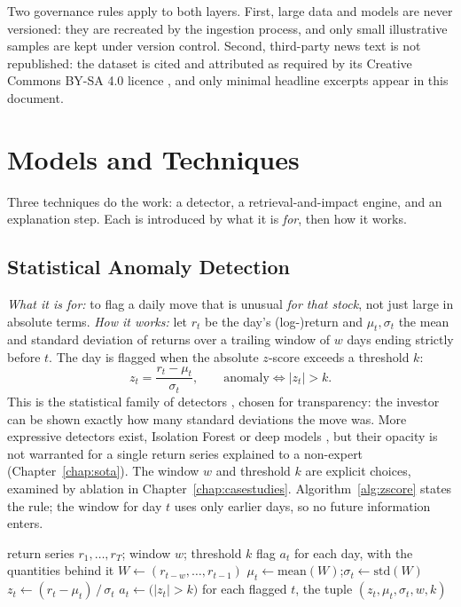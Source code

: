 Two governance rules apply to both layers. First, large data and models are never versioned: they are
recreated by the ingestion process, and only small illustrative samples are kept under version control.
Second, third-party news text is not republished: the dataset is cited and attributed as required by its
Creative Commons BY-SA 4.0 licence \autocite{dong2024fnspid}, and only minimal headline excerpts appear
in this document.

\section{Models and Techniques}
\label{sec:met_techniques}

Three techniques do the work: a detector, a retrieval-and-impact engine, and an explanation step. Each is
introduced by what it is \emph{for}, then how it works.

\subsection{Statistical Anomaly Detection}
\label{sec:met_anomaly}

\emph{What it is for:} to flag a daily move that is unusual \emph{for that stock}, not just large in
absolute terms. \emph{How it works:} let $r_t$ be the day's (log-)return and $\mu_t,\sigma_t$ the mean and
standard deviation of returns over a trailing window of $w$ days ending strictly before $t$. The day is
flagged when the absolute $z$-score exceeds a threshold $k$:
\begin{equation}
z_t = \frac{r_t - \mu_t}{\sigma_t}, \qquad \text{anomaly} \iff |z_t| > k .
\label{eq:zscore}
\end{equation}
This is the statistical family of detectors \autocite{chandola2009anomaly}, chosen for transparency: the
investor can be shown exactly how many standard deviations the move was. More expressive detectors exist,
Isolation Forest \autocite{liu2008isolation} or deep models \autocite{pang2021deep}, but their opacity is
not warranted for a single return series explained to a non-expert (Chapter~\ref{chap:sota}). The window
$w$ and threshold $k$ are explicit choices, examined by ablation in Chapter~\ref{chap:casestudies}.
Algorithm~\ref{alg:zscore} states the rule; the window for day $t$ uses only earlier days, so no future
information enters.

\begin{algorithm}[ht]
\caption{Rolling \emph{z}-score anomaly detection (no lookahead).}
\label{alg:zscore}
\begin{algorithmic}[1]
\Require return series $r_1,\dots,r_T$; window $w$; threshold $k$
\Ensure flag $a_t$ for each day, with the quantities behind it
  \State $W \gets (r_{t-w},\dots,r_{t-1})$ 
  \State $\mu_t \gets \mathrm{mean}(W)$;\quad $\sigma_t \gets \mathrm{std}(W)$
  \State $z_t \gets (r_t - \mu_t)\,/\,\sigma_t$
  \State $a_t \gets \big(|z_t| > k\big)$
\EndFor
\State \Return for each flagged $t$, the tuple $(z_t,\mu_t,\sigma_t,w,k)$ 
\end{algorithmic}
\end{algorithm}


